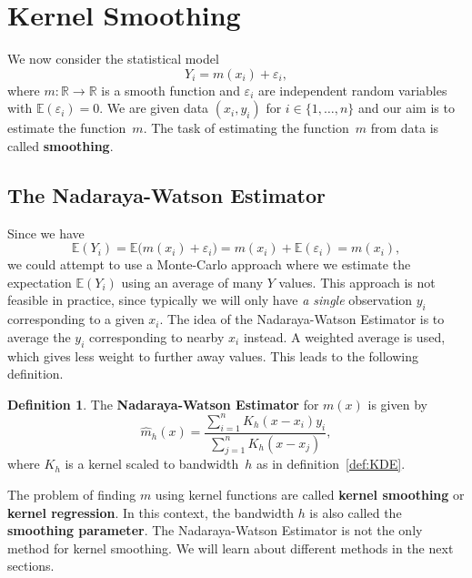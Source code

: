 \documentclass[
  a4paper,
]{article}
\theoremstyle{definition}
\newtheorem{definition}{Definition}[section]
\theoremstyle{definition}
\theoremstyle{definition}
\theoremstyle{definition}
\theoremstyle{remark}
\begin{document}
\clearpage

\section{Kernel Smoothing}\label{X04-smoothing}

We now consider the statistical model
\begin{equation*}
  Y_i
  = m(x_i) + \varepsilon_i,
\end{equation*}
where \(m\colon \mathbb{R}\to \mathbb{R}\) is a smooth function and \(\varepsilon_i\) are independent
random variables with \(\mathbb{E}(\varepsilon_i) = 0\). We are given data \((x_i, y_i)\) for
\(i\in \{1, \ldots, n\}\) and our aim is to estimate the function~\(m\). The
task of estimating the function~\(m\) from data is called \textbf{smoothing}.

\subsection{The Nadaraya-Watson Estimator}\label{the-nadaraya-watson-estimator}

Since we have
\begin{equation*}
  \mathbb{E}(Y_i)
  = \mathbb{E}\bigl( m(x_i) + \varepsilon_i \bigr)
  = m(x_i) + \mathbb{E}( \varepsilon_i )
  = m(x_i),
\end{equation*}
we could attempt to use a Monte-Carlo approach where we estimate the
expectation \(\mathbb{E}(Y_i)\) using an average of many \(Y\) values. This approach is
not feasible in practice, since typically we will only have \emph{a single}
observation \(y_i\) corresponding to a given \(x_i\). The idea of the
Nadaraya-Watson Estimator is to average the \(y_i\) corresponding to nearby \(x_i\)
instead. A weighted average is used, which gives less weight to further away
values. This leads to the following definition.

\begin{definition}
\protect\hypertarget{def:NW}{}\label{def:NW}The \textbf{Nadaraya-Watson Estimator} for \(m(x)\) is given by
\begin{equation*}
  \hat m_h(x)
  = \frac{\sum_{i=1}^n K_h(x - x_i) y_i}{\sum_{j=1}^n K_h(x - x_j)},
\end{equation*}
where \(K_h\) is a kernel scaled to bandwidth~\(h\) as in
definition~\ref{def:KDE}.
\end{definition}

The problem of finding \(m\) using kernel functions are called \textbf{kernel smoothing}
or \textbf{kernel regression}. In this context, the bandwidth \(h\) is also called
the \textbf{smoothing parameter}. The Nadaraya-Watson Estimator is not the only
method for kernel smoothing. We will learn about different methods in the
next sections.
\end{document}
